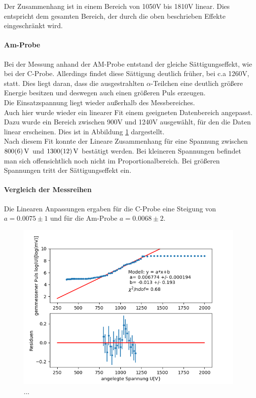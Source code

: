 \documentclass[12pt,a4paper]{article}
\begin{document}
Der Zusammenhang ist in einem Bereich von 1050V bis 1810V linear. Dies entspricht dem gesamten Bereich, der durch die oben beschrieben Effekte eingeschränkt wird. 

\paragraph{Am-Probe}
Bei der Messung anhand der AM-Probe entstand der gleiche Sättigungseffekt, wie bei der C-Probe. Allerdings findet diese Sättigung deutlich früher, bei c.a 1260V, statt. Dies liegt daran, dass die ausgestrahlten $\alpha$-Teilchen eine deutlich größere Energie besitzen und deswegen auch einen größeren Puls erzeugen.\\
Die Einsatzspannung liegt wieder außerhalb des Messbereiches.\\
Auch hier wurde wieder ein linearer Fit einem geeigneten Datenbereich angepasst. Dazu wurde ein Bereich zwischen 900V und 1240V ausgewählt, für den die Daten linear erscheinen. Dies ist in Abbildung \ref{fig:AMPulsfit} dargestellt.\\
Nach diesem Fit konnte der Lineare Zusammenhang für eine Spannung zwischen $\SI{800\pm 6}{V}$ und $\SI{1300\pm 12}{V}$ bestätigt werden. Bei kleineren Spannungen befindet man sich offensichtlich noch nicht im Proportionalbereich. Bei größeren Spannungen tritt der Sättigungseffekt ein.

\paragraph{Vergleich der Messreihen}
Die Linearen Anpassungen ergaben für die C-Probe eine Steigung von $a=0.0075\pm 1$ und für die Am-Probe $a=0.0068\pm 2$.

\begin{figure}
\centering
\includegraphics[scale=0.8]{Bilder/Prop/AM_Pulsfit.PNG}
\caption{...}
\label{fig:AMPulsfit}
\end{figure}
\end{document}
